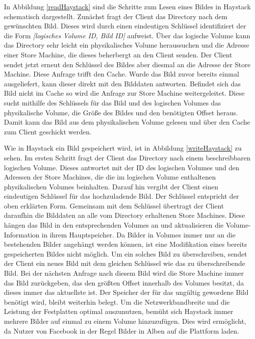 \documentclass[12pt,oneside,a4paper,parskip]{scrbook}
\begin{document}
In Abbildung \ref{readHaystack} sind die Schritte zum Lesen eines Bildes in Haystack schematisch dargestellt. Zunächst fragt der Client das Directory nach dem gewünschten Bild. Dieses wird durch einen eindeutigen Schlüssel identifiziert der die Form \textit{[logisches Volume ID, Bild ID]} aufweist. Über das logische Volume kann das Directory sehr leicht ein physikalisches Volume heraussuchen und die Adresse einer Store Machine, die dieses beherbergt an den Client senden. Der Client sendet jetzt erneut den Schlüssel des Bildes aber diesmal an die Adresse der Store Machine. Diese Anfrage trifft den Cache. Wurde das Bild zuvor bereits einmal ausgeliefert, kann dieser direkt mit den Bilddaten antworten. Befindet sich das Bild nicht im Cache so wird die Anfrage zur Store Machine weitergeleitet. Diese sucht mithilfe des Schlüssels für das Bild und des logischen Volumes das physikalische Volume, die Größe des Bildes und den benötigten Offset heraus. Damit kann das Bild aus dem physikalischen Volume gelesen und über den Cache zum Client geschickt werden. 

Wie in Haystack ein Bild gespeichert wird, ist in Abbildung \ref{writeHaystack} zu sehen. Im ersten Schritt fragt der Client das Directory nach einem beschreibbaren logischen Volume. Dieses antwortet mit der ID des logischen Volumes und den Adressen der Store Machines, die die im logischen Volume enthaltenen physikalischen Volumes beinhalten. Darauf hin vergibt der Client einen eindeutigen Schlüssel für das hochzuladende Bild. Der Schlüssel entspricht der oben erklärten Form. Gemeinsam mit dem Schlüssel übertragt der Client daraufhin die Bilddaten an alle vom Directory erhaltenen Store Machines. Diese hängen das Bild in den entsprechenden Volumes an und aktualisieren die Volume-Information in ihrem Hauptspeicher. Da Bilder in Volumes immer nur an die bestehenden Bilder angehängt werden können, ist eine Modifikation eines bereits gespeicherten Bildes nicht möglich. Um ein solches Bild zu überschreiben, sendet der Client ein neues Bild mit dem gleichen Schlüssel wie das zu überschreibende Bild. Bei der nächsten Anfrage nach diesem Bild wird die Store Machine immer das Bild zurückgeben, das den größten Offset innerhalb des Volumes besitzt, da dieses immer das aktuellste ist. Der Speicher der für das ungültig gewordene Bild benötigt wird, bleibt weiterhin belegt. Um die Netzwerkbandbreite und die Leistung der Festplatten optimal auszunutzen, bemüht sich Haystack immer mehrere Bilder auf einmal zu einem Volume hinzuzufügen. Dies wird ermöglicht, da Nutzer von Facebook in der Regel Bilder in Alben auf die Plattform laden.
\end{document}
